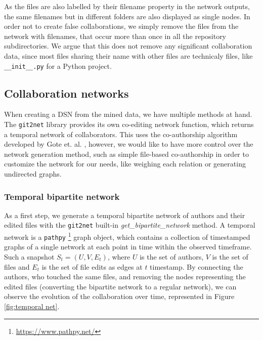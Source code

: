 As the files are also labelled by their filename property in the network outputs, the same filenames but in different folders are also displayed as single nodes. In order not to create false collaborations, we simply remove the files from the network with filenames, that occur more than once in all the repository subdirectories. We argue that this does not remove any significant collaboration data, since most files sharing their name with other files are technicaly files, like \texttt{\_\_init\_\_.py} for a Python project.

\subsection{Collaboration networks}

When creating a DSN from the mined data, we have multiple methods at hand. The \texttt{git2net} library provides its own co-editing network function, which returns a temporal network of collaborators. This uses the co-authorship algorithm developed by Gote et. al. \cite{goteAnalysingTimeStampedCoEditing2019}, however, we would like to have more control over the network generation method, such as simple file-based co-authorship in order to customize the network for our needs, like weighing each relation or generating undirected graphs.

\subsubsection{Temporal bipartite network}
As a first step, we generate a temporal bipartite network of authors and their edited files with the \texttt{git2net} built-in \textit{get\_bipartite\_network} method. A temporal network is a \texttt{pathpy} \footnote{\url{https://www.pathpy.net/}} graph object, which contains a collection of timestamped graphs of a single network at each point in time within the observed timeframe. Such a snapshot $S_t = (U, V, E_t)$, where $U$ is the set of authors, $V$ is the set of files and $E_t$ is the set of file edits as edges at $t$ timestamp. By connecting the authors, who touched the same files, and removing the nodes representing the edited files (converting the bipartite network to a regular network), we can observe the evolution of the collaboration over time, represented in Figure \ref{fig:temporal net}.


